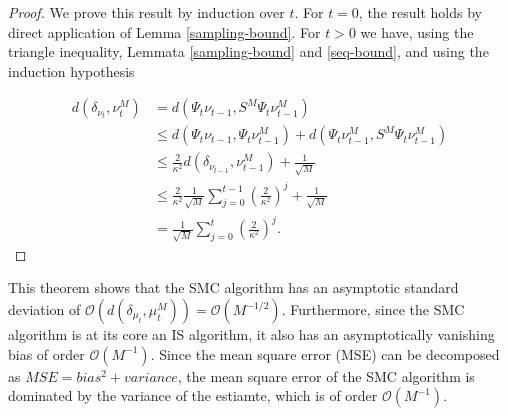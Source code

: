 \begin{proof}
  We prove this result by induction over $t$. For $t=0$, the result holds by direct application of Lemma \ref{sampling-bound}. For $t > 0$ we have, using the triangle inequality, Lemmata \ref{sampling-bound} and \ref{seq-bound}, and using the induction hypothesis

  \begin{equation*}
    \begin{aligned}
      d(\delta_{\nu_t}, \nu_t^M)
      &= d(\Psi_t\nu_{t-1}, S^M\Psi_t\nu_{t-1}^M)\\
      &\le d(\Psi_t\nu_{t-1}, \Psi_t\nu_{t-1}^M) + d(\Psi_t\nu_{t-1}^M, S^M\Psi_t\nu_{t-1}^M)\\
      &\le \frac2{\kappa^2}d(\delta_{\nu_{t-1}}, \nu_{t-1}^M) + \frac1{\sqrt{M}}\\
      &\le \frac2{\kappa^2}\frac1{\sqrt{M}}\sum_{j=0}^{t-1}\left(\frac2{\kappa^2}\right)^j + \frac1{\sqrt{M}}\\
      &= \frac1{\sqrt{M}}\sum_{j=0}^t\left(\frac2{\kappa^2}\right)^j.
    \end{aligned}
  \end{equation*}
\end{proof}



This theorem shows that the SMC algorithm has an asymptotic standard deviation of $\mathcal{O}(d(\delta_{\mu_t}, \mu^M_t)) = \mathcal{O}(M^{-1/2})$. Furthermore, since the SMC algorithm is at its core an IS algorithm, it also has an asymptotically vanishing bias of order $\mathcal{O}(M^{-1})$. Since the mean square error (MSE) can be decomposed as $MSE = bias^2 + variance$, the mean square error of the SMC algorithm is dominated by the variance of the estiamte, which is of order $\mathcal{O}(M^{-1})$.

